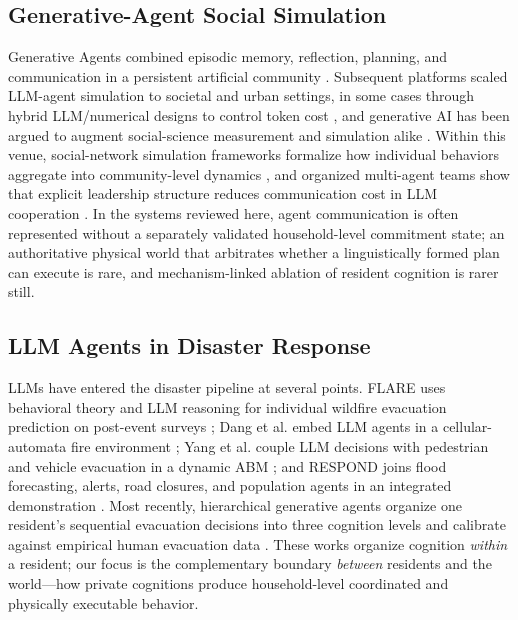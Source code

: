 \documentclass[journal]{IEEEtran}
\begin{document}
\subsection{Generative-Agent Social Simulation}

Generative Agents combined episodic memory, reflection, planning, and
communication in a persistent artificial community
\cite{park2023generativeagents}.
Subsequent platforms scaled LLM-agent simulation to societal and urban
settings, in some cases through hybrid LLM/numerical designs to control token
cost \cite{zhang2025agentsociety,bougie2025citysim,zhou2026gasim}, and
generative AI has been argued to augment social-science measurement and
simulation alike \cite{bail2024generativeai}. Within this venue, social-network
simulation frameworks formalize how individual behaviors aggregate into
community-level dynamics \cite{rende2025crowd}, and organized multi-agent teams
show that explicit leadership structure reduces communication cost in LLM
cooperation \cite{guo2026embodied}. In the systems
reviewed here, agent communication is often represented without a separately
validated household-level commitment state; an authoritative physical world
that arbitrates whether a linguistically formed plan can execute is rare, and
mechanism-linked ablation of resident cognition is rarer still.

\subsection{LLM Agents in Disaster Response}

LLMs have entered the disaster pipeline at several points. FLARE uses
behavioral theory and LLM reasoning
for individual wildfire evacuation prediction on post-event surveys
\cite{chen2025flare}; Dang et al. embed LLM agents in a cellular-automata fire
environment \cite{dang2025fireagents}; Yang et al. couple LLM decisions with
pedestrian and vehicle evacuation in a dynamic ABM \cite{yang2026whenagents};
and RESPOND joins flood forecasting, alerts, road closures, and population
agents in an integrated demonstration \cite{sultimov2026respond}. Most
recently, hierarchical generative agents organize
one resident's sequential evacuation decisions into three cognition levels and
calibrate against empirical human evacuation data
\cite{mendoza2026hierarchical}. These works organize cognition \emph{within} a
resident; our focus is the complementary boundary \emph{between} residents and
the world---how private cognitions produce household-level coordinated and
physically executable behavior.
\end{document}
